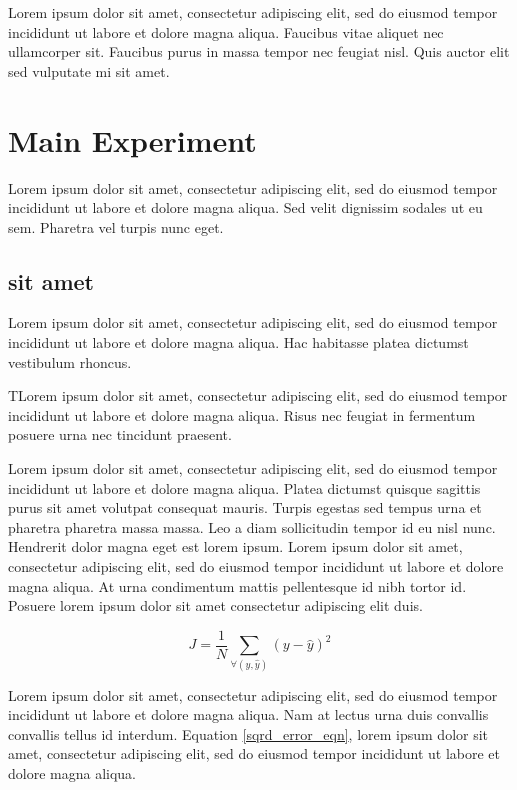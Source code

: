 \documentclass{cup-ino}
\begin{document}
Lorem ipsum dolor sit amet, consectetur adipiscing elit, sed do eiusmod tempor incididunt ut labore et dolore magna aliqua. Faucibus vitae aliquet nec ullamcorper sit. Faucibus purus in massa tempor nec feugiat nisl. Quis auctor elit sed vulputate mi sit amet.

\section{Main Experiment}
Lorem ipsum dolor sit amet, consectetur adipiscing elit, sed do eiusmod tempor incididunt ut labore et dolore magna aliqua. Sed velit dignissim sodales ut eu sem. Pharetra vel turpis nunc eget.
\subsection{sit amet}
Lorem ipsum dolor sit amet, consectetur adipiscing elit, sed do eiusmod tempor incididunt ut labore et dolore magna aliqua. Hac habitasse platea dictumst vestibulum rhoncus.

TLorem ipsum dolor sit amet, consectetur adipiscing elit, sed do eiusmod tempor incididunt ut labore et dolore magna aliqua. Risus nec feugiat in fermentum posuere urna nec tincidunt praesent.

Lorem ipsum dolor sit amet, consectetur adipiscing elit, sed do eiusmod tempor incididunt ut labore et dolore magna aliqua. Platea dictumst quisque sagittis purus sit amet volutpat consequat mauris. Turpis egestas sed tempus urna et pharetra pharetra massa massa. Leo a diam sollicitudin tempor id eu nisl nunc. Hendrerit dolor magna eget est lorem ipsum. Lorem ipsum dolor sit amet, consectetur adipiscing elit, sed do eiusmod tempor incididunt ut labore et dolore magna aliqua. At urna condimentum mattis pellentesque id nibh tortor id. Posuere lorem ipsum dolor sit amet consectetur adipiscing elit duis.

\begin{equation} 
\label{sqrd_error_eqn}
J = \frac{1}{N}\sum_{\forall(y, \hat{y})}(y-\hat{y})^2
\end{equation}

\noindent Lorem ipsum dolor sit amet, consectetur adipiscing elit, sed do eiusmod tempor incididunt ut labore et dolore magna aliqua. Nam at lectus urna duis convallis convallis tellus id interdum. Equation \ref{sqrd_error_eqn}, lorem ipsum dolor sit amet, consectetur adipiscing elit, sed do eiusmod tempor incididunt ut labore et dolore magna aliqua.
\end{document}
